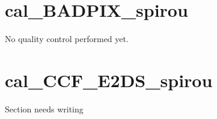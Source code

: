 \section{cal\_BADPIX\_spirou}
\label{section:qc_cal_BADPIX_spirou}


No quality control performed yet.


\section{cal\_CCF\_E2DS\_spirou}
\label{section:qc_cal_CCF_E2DS_spirou}


Section needs writing


